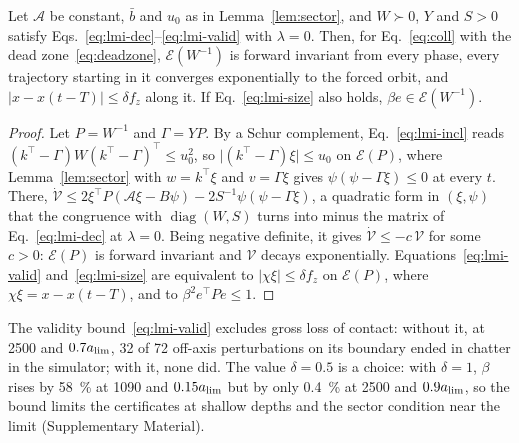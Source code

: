 \begin{proposition}\label{prop:c2}
Let $\mathcal A$ be constant, $\bar b$ and $u_0$ as in Lemma~\ref{lem:sector}, and $W\succ0$, $Y$ and $S>0$ satisfy Eqs.~\eqref{eq:lmi-dec}--\eqref{eq:lmi-valid} with $\lambda=0$. Then, for Eq.~\eqref{eq:coll} with the dead zone~\eqref{eq:deadzone}, $\mathcal E(W^{-1})$ is forward invariant from every phase, every trajectory starting in it converges exponentially to the forced orbit, and $\lvert x-x(t-T)\rvert\le\delta f_z$ along it. If Eq.~\eqref{eq:lmi-size} also holds, $\beta e\in\mathcal E(W^{-1})$.
\end{proposition}
\begin{proof}
Let $P=W^{-1}$ and $\Gamma=YP$. By a Schur complement, Eq.~\eqref{eq:lmi-incl} reads $(k^\top-\Gamma)W(k^\top-\Gamma)^\top\le u_0^2$, so $\lvert(k^\top-\Gamma)\xi\rvert\le u_0$ on $\mathcal E(P)$, where Lemma~\ref{lem:sector} with $w=k^\top\xi$ and $v=\Gamma\xi$ gives $\psi(\psi-\Gamma\xi)\le0$ at every $t$. There, $\dot{\mathcal V}\le2\xi^\top P(\mathcal A\xi-B\psi)-2S^{-1}\psi(\psi-\Gamma\xi)$, a quadratic form in $(\xi,\psi)$ that the congruence with $\operatorname{diag}(W,S)$ turns into minus the matrix of Eq.~\eqref{eq:lmi-dec} at $\lambda=0$. Being negative definite, it gives $\dot{\mathcal V}\le-c\,\mathcal V$ for some $c>0$: $\mathcal E(P)$ is forward invariant and $\mathcal V$ decays exponentially. Equations~\eqref{eq:lmi-valid} and~\eqref{eq:lmi-size} are equivalent to $\lvert\chi\xi\rvert\le\delta f_z$ on $\mathcal E(P)$, where $\chi\xi=x-x(t-T)$, and to $\beta^2e^\top Pe\le1$.
\end{proof}

The validity bound~\eqref{eq:lmi-valid} excludes gross loss of contact: without it, at \SI{2500}{\rpm} and $0.7a_{\lim}$, 32 of 72 off-axis perturbations on its boundary ended in chatter in the simulator; with it, none did. The value $\delta=0.5$ is a choice: with $\delta=1$, $\beta$ rises by \SI{58}{\percent} at \SI{1090}{\rpm} and $0.15a_{\lim}$ but by only \SI{0.4}{\percent} at \SI{2500}{\rpm} and $0.9a_{\lim}$, so the bound limits the certificates at shallow depths and the sector condition near the limit (Supplementary Material).


